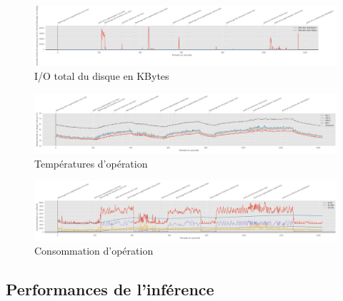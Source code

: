 {\begin{landscape}
\begin{figure}[H]
      \centering
      \includegraphics[width=1.5\textwidth]{io_totaldisk}
      \caption{I/O total du disque en KBytes}
      \label{fig:io_totaldisk}
   \end{figure} 
   \begin{figure}[H]
      \centering
      \includegraphics[width=1.5\textwidth]{temperature}
      \caption[Températures d'opération]{Températures d'opération\protect\footnotemark}
      \label{fig:temperature}
   \end{figure} 
   \begin{figure}[H]
      \centering
      \includegraphics[width=1.5\textwidth]{consommation}
      \caption{Consommation d'opération}
      \label{fig:consommation}
   \end{figure}
   \end{landscape}
   \clearpage
   \newpage
}
\subsection{Performances de l'inférence}
